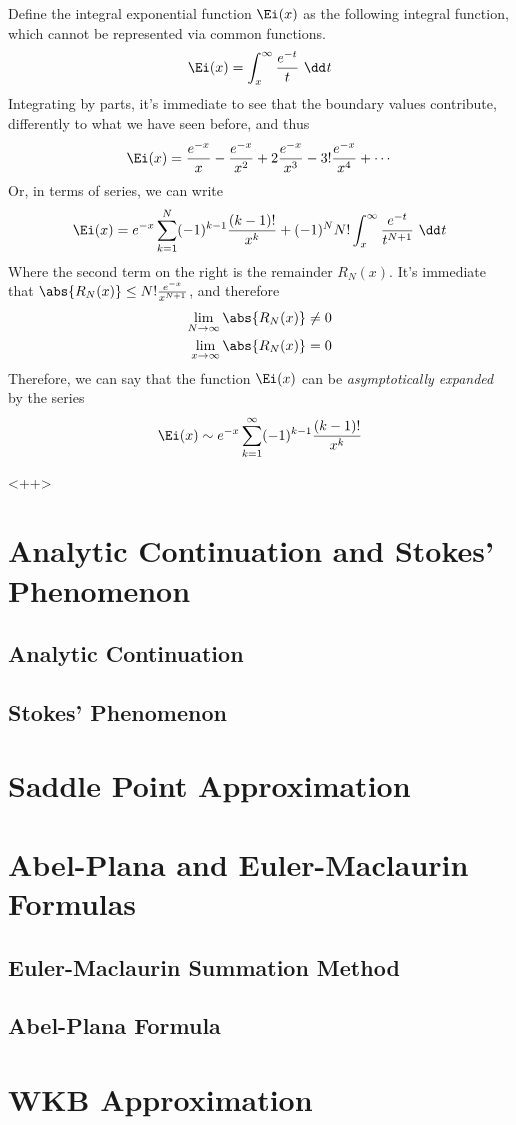 \documentclass[../mmf.tex]{subfiles}
\begin{document}
\begin{eg}
	Define the integral exponential function $\Ei(x)$ as the following integral function, which cannot be represented via common functions.
	\begin{equation}
		\Ei(x)=\int_{x}^{\infty}\frac{e^{-t}}{t}\ \dd^{}{t}
		\label{eq:eifn}
	\end{equation}
	Integrating by parts, it's immediate to see that the boundary values contribute, differently to what we have seen before, and thus
	\begin{equation*}
		\Ei(x)=\frac{e^{-x}}{x}-\frac{e^{-x}}{x^2}+2\frac{e^{-x}}{x^3}-3!\frac{e^{-x}}{x^4}+\cdots
	\end{equation*}
	Or, in terms of series, we can write
	\begin{equation*}
		\Ei(x)=e^{-x}\sum_{k=1}^{N}(-1)^{k-1}\frac{(k-1)!}{x^k}+(-1)^{N}N!\int_{x}^{\infty}\frac{e^{-t}}{t^{N+1}}\ \dd^{}{t}
	\end{equation*}
	Where the second term on the right is the remainder $R_N(x)$. It's immediate that $\abs{R_{N}(x)}\le N!\frac{e^{-x}}{x^{N+1}}$, and therefore
	\begin{equation*}
		\begin{aligned}
			\lim_{N\to\infty}\abs{R_N(x)}&\ne0\\
			\lim_{x\to\infty}\abs{R_N(x)}&= 0
		\end{aligned}
	\end{equation*}
	Therefore, we can say that the function $\Ei(x)$ can be \textit{asymptotically expanded} by the series
	\begin{equation*}
		\Ei(x)\sim e^{-x}\sum_{k=1}^{\infty}(-1)^{k-1}\frac{(k-1)!}{x^{k}}
	\end{equation*}

\end{eg}<++>
\section{Analytic Continuation and Stokes' Phenomenon}
\subsection{Analytic Continuation}
\subsection{Stokes' Phenomenon}
\section{Saddle Point Approximation}
\section{Abel-Plana and Euler-Maclaurin Formulas}
\subsection{Euler-Maclaurin Summation Method}
\subsection{Abel-Plana Formula}
\section{WKB Approximation}
\end{document}

